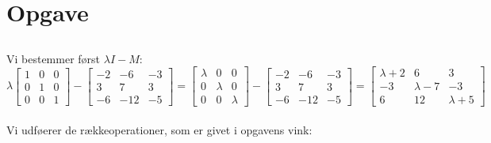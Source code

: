 \documentclass[a4paper,12pt]{article}
\begin{document}
\subsection{}


\subsection{}


\section[Opgave]{Opgave}
\subsection{}

Vi bestemmer først $\lambda I - M$:
\[
\lambda
\left[\begin{array}{ccc}
    1 & 0 & 0\\
    0 & 1 & 0 \\
    0 & 0 & 1
\end{array}\right]
-
\left[\begin{array}{ccc}
    -2 & -6 & -3\\
    3 & 7 & 3 \\
    -6 & -12 & -5
\end{array}\right]
=
\left[\begin{array}{ccc}
    \lambda & 0 & 0\\
    0 & \lambda & 0 \\
    0 & 0 & \lambda
\end{array}\right]
-
\left[\begin{array}{ccc}
    -2 & -6 & -3\\
    3 & 7 & 3 \\
    -6 & -12 & -5
\end{array}\right]
=
\left[\begin{array}{ccc}
    \lambda+2 & 6 & 3\\
    -3 & \lambda-7 & -3 \\
    6 & 12 & \lambda+5
\end{array}\right]
\]\\

Vi udføerer de rækkeoperationer, som er givet i opgavens vink:\\
\end{document}
